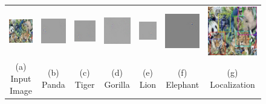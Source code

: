 \setlength{\tabcolsep}{2pt}
\begin{figure}[htb]
\begin{center}
\begin{tabular}{ccccccc}
\includegraphics[width=0.13\linewidth]{figs/splash1/original} &
\includegraphics[width=0.13\linewidth]{figs/splash1/panda} &
\includegraphics[width=0.13\linewidth]{figs/splash1/tiger} &
\includegraphics[width=0.13\linewidth]{figs/splash1/gorilla} &
\includegraphics[width=0.13\linewidth]{figs/splash1/lion} &
\includegraphics[width=0.13\linewidth]{figs/splash1/elephant} &
\includegraphics[width=0.13\linewidth]{figs/splash1/localization}\\
{\small (a) Input Image} &
{\small (b) Panda} &
{\small (c) Tiger} &
{\small (d) Gorilla} &
{\small (e) Lion} &
{\small (f) Elephant} &
{\small (g) Localization}
\end{tabular}

\end{center}
\end{figure}

